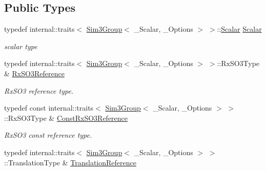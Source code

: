 \subsection*{Public Types}
\begin{DoxyCompactItemize}
\item 
typedef internal\+::traits$<$ \hyperlink{class_sophus_1_1_sim3_group}{Sim3\+Group}$<$ \+\_\+\+Scalar, \+\_\+\+Options $>$ $>$\+::\hyperlink{class_sophus_1_1_sim3_group_a5db0ba2bb3fe2471006c9f366077c5bb}{Scalar} \hyperlink{class_sophus_1_1_sim3_group_a5db0ba2bb3fe2471006c9f366077c5bb}{Scalar}\hypertarget{class_sophus_1_1_sim3_group_a5db0ba2bb3fe2471006c9f366077c5bb}{}\label{class_sophus_1_1_sim3_group_a5db0ba2bb3fe2471006c9f366077c5bb}

\begin{DoxyCompactList}\small\item\em scalar type \end{DoxyCompactList}\item 
typedef internal\+::traits$<$ \hyperlink{class_sophus_1_1_sim3_group}{Sim3\+Group}$<$ \+\_\+\+Scalar, \+\_\+\+Options $>$ $>$\+::Rx\+S\+O3\+Type \& \hyperlink{class_sophus_1_1_sim3_group_a0010f4f99876a2165913382fa69117d8}{Rx\+S\+O3\+Reference}\hypertarget{class_sophus_1_1_sim3_group_a0010f4f99876a2165913382fa69117d8}{}\label{class_sophus_1_1_sim3_group_a0010f4f99876a2165913382fa69117d8}

\begin{DoxyCompactList}\small\item\em Rx\+S\+O3 reference type. \end{DoxyCompactList}\item 
typedef const internal\+::traits$<$ \hyperlink{class_sophus_1_1_sim3_group}{Sim3\+Group}$<$ \+\_\+\+Scalar, \+\_\+\+Options $>$ $>$\+::Rx\+S\+O3\+Type \& \hyperlink{class_sophus_1_1_sim3_group_a47e81f13e85164a1372395d978ab86fe}{Const\+Rx\+S\+O3\+Reference}\hypertarget{class_sophus_1_1_sim3_group_a47e81f13e85164a1372395d978ab86fe}{}\label{class_sophus_1_1_sim3_group_a47e81f13e85164a1372395d978ab86fe}

\begin{DoxyCompactList}\small\item\em Rx\+S\+O3 const reference type. \end{DoxyCompactList}\item 
typedef internal\+::traits$<$ \hyperlink{class_sophus_1_1_sim3_group}{Sim3\+Group}$<$ \+\_\+\+Scalar, \+\_\+\+Options $>$ $>$\+::Translation\+Type \& \hyperlink{class_sophus_1_1_sim3_group_a56c24566b7aed53015817b59e86989ce}{Translation\+Reference}\hypertarget{class_sophus_1_1_sim3_group_a56c24566b7aed53015817b59e86989ce}{}\label{class_sophus_1_1_sim3_group_a56c24566b7aed53015817b59e86989ce}


\end{DoxyCompactItemize}
